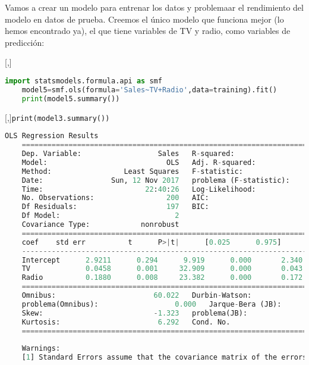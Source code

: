 Vamos a crear un modelo para entrenar los datos y problemaar el rendimiento del modelo en
datos de prueba. Creemos el único modelo que funciona mejor (lo hemos encontrado ya),
el que tiene variables de TV y radio, como variables de predicción:

[,]{}
\begin{lstlisting}[language=Python]
	import statsmodels.formula.api as smf
	model5=smf.ols(formula='Sales~TV+Radio',data=training).fit()
	print(model5.summary())
\end{lstlisting}

[,]{\texttt{print(model3.summary())}}

\begin{lstlisting}[language=Python]
	OLS Regression Results
	==============================================================================
	Dep. Variable:                  Sales   R-squared:                       0.897
	Model:                            OLS   Adj. R-squared:                  0.896
	Method:                 Least Squares   F-statistic:                     859.6
	Date:                Sun, 12 Nov 2017   problema (F-statistic):           4.83e-98
	Time:                        22:40:26   Log-Likelihood:                -386.20
	No. Observations:                 200   AIC:                             778.4
	Df Residuals:                     197   BIC:                             788.3
	Df Model:                           2
	Covariance Type:            nonrobust
	==============================================================================
	coef    std err          t      P>|t|      [0.025      0.975]
	------------------------------------------------------------------------------
	Intercept      2.9211      0.294      9.919      0.000       2.340       3.502
	TV             0.0458      0.001     32.909      0.000       0.043       0.048
	Radio          0.1880      0.008     23.382      0.000       0.172       0.204
	==============================================================================
	Omnibus:                       60.022   Durbin-Watson:                   2.081
	problema(Omnibus):                  0.000   Jarque-Bera (JB):              148.679
	Skew:                          -1.323   problema(JB):                     5.19e-33
	Kurtosis:                       6.292   Cond. No.                         425.
	==============================================================================
	
	Warnings:
	[1] Standard Errors assume that the covariance matrix of the errors is correctly specified.
\end{lstlisting}

